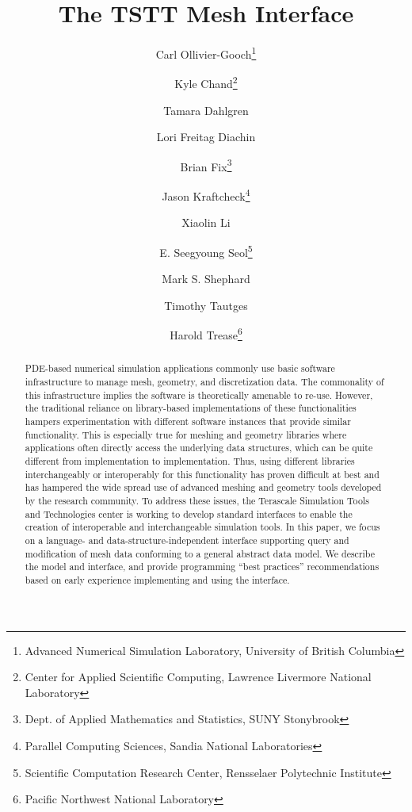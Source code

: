 \documentclass{aiaa-tc}
\begin{document}
\title{The TSTT Mesh Interface}


\author{Carl Ollivier-Gooch\thanks{Advanced Numerical Simulation
    Laboratory, University of British Columbia} \and Kyle
  Chand\thanks{Center for Applied Scientific Computing, Lawrence
    Livermore National Laboratory} \and Tamara Dahlgren
    \and Lori Freitag Diachin \and Brian
    Fix\thanks{Dept. of Applied Mathematics and Statistics, SUNY
    Stonybrook} \and Jason Kraftcheck\thanks{Parallel Computing
    Sciences, Sandia National Laboratories} \and Xiaolin
    Li \and E. Seegyoung Seol\thanks{Scientific
    Computation Research Center, Rensselaer Polytechnic Institute } \and
    Mark S. Shephard \and Timothy Tautges \and
    Harold Trease\thanks{Pacific Northwest National Laboratory} }

\maketitle
\begin{abstract}

PDE-based numerical simulation applications commonly use basic software
infrastructure to manage mesh, geometry, and discretization data. The
commonality of this infrastructure implies the software is theoretically
amenable to re-use. However, the traditional reliance on library-based
implementations of these functionalities hampers experimentation with
different software instances that provide similar functionality.  This
is especially true for meshing and geometry libraries where applications
often directly access the underlying data structures, which can be quite
different from implementation to implementation.  Thus, using different
libraries interchangeably or interoperably for this functionality has
proven difficult at best and has hampered the wide spread use of
advanced meshing and geometry tools developed by the research community.
To address these issues, the Terascale Simulation Tools and Technologies
center is working to develop standard interfaces to enable the creation
of interoperable and interchangeable simulation tools. In this paper, we
focus on a language- and data-structure-independent interface supporting
query and modification of mesh data conforming to a general abstract
data model. We describe the model and interface, and provide programming
``best practices'' recommendations based on early experience
implementing and using the interface.

\end{abstract}
\end{document}
